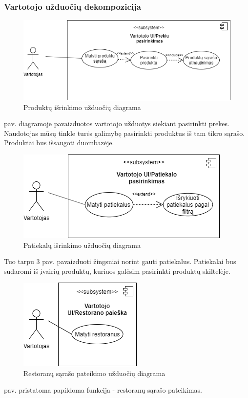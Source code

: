 \documentclass{VUMIFInfKursinis}
\begin{document}
\subsubsection{Vartotojo užduočių dekompozicija}
\begin{figure}[H]
    \centering
 \includegraphics[scale=0.6]{img/decProd}
    \caption{Produktų išrinkimo užduočių diagrama}   %
    \label{img:mlp}
\end{figure}
  pav. diagramoje pavaizduotos vartotojo užduotys siekiant pasirinkti prekes. Naudotojas mūsų tinkle turės galimybę pasirinkti produktus iš tam tikro sąrašo. Produktai bus išsaugoti duombazėje. 
\bigskip
\begin{figure}[H]
    \centering
 \includegraphics[scale=0.6]{img/decPat}
    \caption{Patiekalų išrinkimo užduočių diagrama}   %
    \label{img:mlp}
\end{figure}
\bigskip
Tuo tarpu 3 pav. pavaizduoti žingsniai norint gauti patiekalus. Patiekalai bus sudaromi iš įvairių produktų, kuriuos galėsim pasirinkti produktų skiltelėje.
\bigskip
\begin{figure}[H]
    \centering
 \includegraphics[scale=0.6]{img/decRest}
    \caption{Restoranų sąrašo pateikimo užduočių diagrama}   %
    \label{img:mlp}
\end{figure}
 pav. pristatoma papildoma funkcija - restoranų sąrašo pateikimas. 
\end{document}

